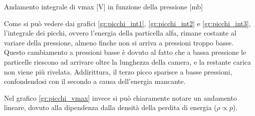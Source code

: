 \begin{grafico}
 \centering
 \caption{Andamento integrale di vmax [V] in funzione della pressione [mb]} 
 \label{gr:picchi_vmax} 
\end{grafico}

Come si può vedere dai grafici 	\autoref{gr:picchi_int1}, \autoref{gr:picchi_int2} e \autoref{gr:picchi_int3}, l'integrale dei picchi, ovvero l'energia della particella alfa, rimane costante al variare della pressione,
almeno finche non si arriva a pressioni troppo basse. Questo cambiamento a pressioni basse è dovuto al fatto che a bassa pressione le particelle riescono ad arrivare oltre la lunghezza della camera, e la restante carica non viene più rivelata.
Addirittura, il terzo picco sparisce a basse pressioni, confondendosi con il secondo a causa dell'energia mancante.

Nel grafico \autoref{gr:picchi_vmax} invece si può chiaramente notare un andamento lineare, dovuto alla dipendenza dalla densità della perdita di energia ($\rho\propto p$).

\FloatBarrier